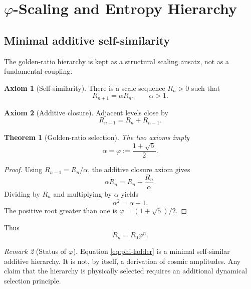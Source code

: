 \documentclass[11pt,a4paper]{article}
\newtheorem{theorem}{Theorem}[section]
\theoremstyle{definition}
\newtheorem{axiom}{Axiom}
\theoremstyle{remark}
\newtheorem{remark}[theorem]{Remark}
\newcommand{\golden}{\varphi}
\begin{document}
\section{\texorpdfstring{$\golden$}{phi}-Scaling and Entropy Hierarchy}

\subsection{Minimal additive self-similarity}

The golden-ratio hierarchy is kept as a structural scaling ansatz, not as a fundamental coupling.

\begin{axiom}[Self-similarity]
There is a scale sequence $R_{n}>0$ such that
\begin{equation}
R_{n+1}=\alpha R_{n},\qquad \alpha>1.
\end{equation}
\end{axiom}

\begin{axiom}[Additive closure]
Adjacent levels close by
\begin{equation}
R_{n+1}=R_{n}+R_{n-1}.
\end{equation}
\end{axiom}

\begin{theorem}[Golden-ratio selection]
The two axioms imply
\begin{equation}
\alpha=\golden:=\frac{1+\sqrt5}{2}.
\end{equation}
\end{theorem}

\begin{proof}
Using $R_{n-1}=R_{n}/\alpha$, the additive closure axiom gives
\[
\alpha R_{n}=R_{n}+\frac{R_{n}}{\alpha}.
\]
Dividing by $R_{n}$ and multiplying by $\alpha$ yields
\[
\alpha^{2}=\alpha+1.
\]
The positive root greater than one is $\golden=(1+\sqrt5)/2$.
\end{proof}

Thus
\begin{equation}
R_{n}=R_{0}\golden^{n}.
\label{eq:phi-ladder}
\end{equation}

\begin{remark}[Status of $\golden$]
Equation \eqref{eq:phi-ladder} is a minimal self-similar additive hierarchy.  It is not, by itself,
a derivation of cosmic amplitudes.  Any claim that the hierarchy is physically selected requires
an additional dynamical selection principle.
\end{remark}
\end{document}
